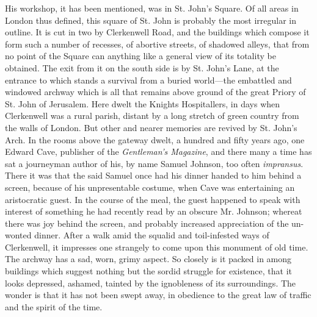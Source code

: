 His workshop, it has been mentioned, was in St. John's Square. Of all
areas in London thus defined, this square of St. John is probably the
most irregular in outline. It is cut in two by Clerkenwell Road, and the
buildings which compose it form such a number of recesses, of abortive
streets, of shadowed alleys, that from no point of the Square can
{}anything like a general view of its totality be obtained. The exit
from it on the south side is by St. John's Lane, at the entrance to
which stands a survival from a buried world---the embattled and windowed
archway which is all that remains above ground of the great Priory of
St. John of Jerusalem. Here dwelt the Knights Hospitallers, in days when
Clerkenwell was a rural parish, distant by a long stretch of green
country from the walls of London. But other and nearer memories are
revived by St. John's Arch. In the rooms above the gateway dwelt, a
hundred and fifty years ago, one Edward Cave, publisher of the
\emph{Gentleman's Magazine}, and there many a time has sat a journeyman
author of his, by name Samuel Johnson, too often \emph{impransus}. There
it was that the said Samuel once had his dinner handed to him behind a
screen, because of his unpresentable costume, when Cave was entertaining
an aristocratic guest. In the course of the meal, the guest happened to
speak with interest of something he had recently read by an obscure Mr.
Johnson; {}whereat there was joy behind the screen, and probably
increased appreciation of the un-wonted dinner. After a walk amid the
squalid and toil-infested ways of Clerkenwell, it impresses one
strangely to come upon this monument of old time. The archway has a sad,
worn, grimy aspect. So closely is it packed in among buildings which
suggest nothing but the sordid struggle for existence, that it looks
depressed, ashamed, tainted by the ignobleness of its surroundings. The
wonder is that it has not been swept away, in obedience to the great law
of traffic and the spirit of the time.

